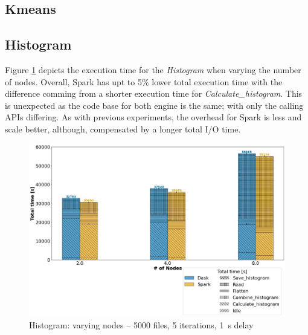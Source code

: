 \documentclass[conference]{IEEEtran}
\begin{document}

\subsection{Kmeans}


\subsection{Histogram}
Figure \ref{fig:histogram_worker} depicts the execution time for the \textit{Histogram} when varying the number of nodes.
Overall, Spark has upt to 5\% lower total execution time with the difference comming from a shorter execution time for \textit{Calculate\_histogram}.
This is unexpected as the code base for both engine is the same; with only the calling APIs differing.
As with previous experiments, the overhead for Spark is less and scale better, although, compensated by a longer total I/O time.
\begin{figure}[!h]
	\centering
	\includegraphics[clip,width=\columnwidth]{figures/stacked_histogram_worker.jpg}
	\caption{Histogram: varying nodes -- 5000 files, 5 iterations, \SI{1}{\second} delay}
	\label{fig:histogram_worker}
\end{figure}
\end{document}

